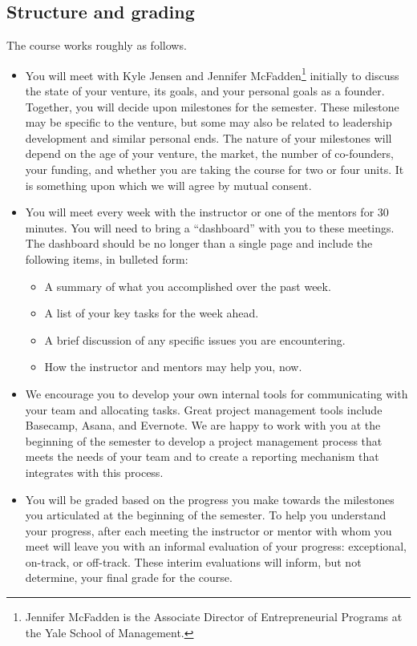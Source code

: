 \subsection*{Structure and grading}

The course works roughly as follows.
\begin{itemize}
	\item You will meet with Kyle Jensen and Jennifer McFadden\footnote{Jennifer McFadden is the Associate Director of Entrepreneurial Programs at the Yale School of Management.}
		initially to discuss
		the state
		of your venture, its goals, and your personal goals as a founder.
		Together, you will decide upon milestones for the semester. These
		milestone may be specific to the venture, but some may also be related
		to leadership development and similar personal ends. The nature of your
		milestones will depend on the age of your venture, the market,
		the number of co-founders, your funding, and whether you are taking
		the course for two or four units. It is something upon
		which we will agree by mutual consent.
	\item You will meet every week with the instructor or one of the
			mentors for 30 minutes. You will need to bring a ``dashboard''
			with you to these meetings. The dashboard should be no longer than a single page and include the following items, in bulleted form:
			\begin{itemize}
				\item A summary of what you accomplished over the past week.
				\item A list of your key tasks for the week ahead.
				\item A brief discussion of any specific issues you are encountering.
				\item How the instructor and
					mentors may help you, now.
			\end{itemize}
	\item We encourage you to develop your own internal tools for communicating with your team and allocating tasks. Great project management tools include Basecamp, Asana, and Evernote. We are happy to work with you at the beginning of the semester to develop a project management process that meets the needs of your team and to create a reporting mechanism that integrates with this process.
	\item You will be graded based on the progress you make towards the
		milestones you articulated at the beginning of the semester.
		To help you understand your progress, after each meeting the
		instructor or mentor with whom you meet will leave you with an
		informal evaluation of your progress: exceptional, on-track, or
		off-track. These interim evaluations will inform, but not
		determine, your final 
		grade for the course.

\end{itemize}

